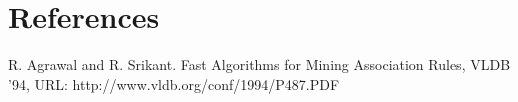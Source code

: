 \documentclass[11pt]{article}
\begin{document}
    \begin{center}
    \end{center}
    { \hspace*{\fill} \\}
    
    \begin{Verbatim}[commandchars=\\\{\}]


    \end{Verbatim}

    \hypertarget{references}{%
\section{References}\label{references}}

R. Agrawal and R. Srikant. Fast Algorithms for Mining Association Rules,
VLDB '94, URL: http://www.vldb.org/conf/1994/P487.PDF


    
    
    
    
\end{document}
